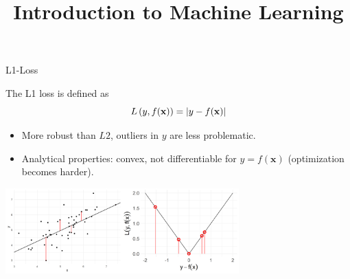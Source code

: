 \documentclass[11pt,compress,t,notes=noshow, xcolor=table]{beamer}
\title{Introduction to Machine Learning}
\institute{\href{https://compstat-lmu.github.io/lecture_i2ml/}{compstat-lmu.github.io/lecture\_i2ml}}
\date{}
\begin{document}


\begin{vbframe}{L1-Loss}

\vspace*{-0.1cm}
The L1 loss is defined as
$$
L\left(y, f(\mathbf{x})\right) = \left|y-f(\mathbf{x})\right|
$$

\begin{itemize}
\setlength{\itemsep}{1.5em}
\item More robust than $L2$, outliers in $y$ are less problematic.
\item Analytical properties: convex, not differentiable for $y = f(\bm{x})$ (optimization becomes harder).
\end{itemize}

\vspace*{0.2cm}

\begin{center}  \includegraphics[width = 9cm]{figure/loss_absolute_2.png} \\
\end{center}


\end{vbframe}
\end{document}
